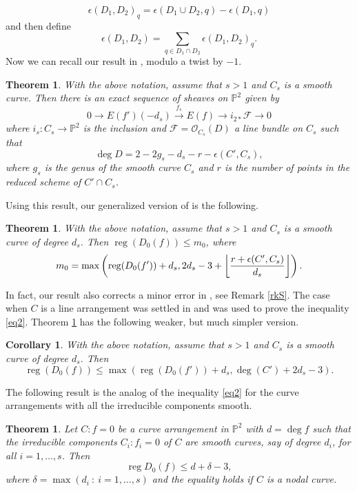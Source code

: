 \documentclass[12pt]{amsart}
\theoremstyle{plain}
\newtheorem{thm}[subsection]{Theorem}
\newtheorem{cor}[subsection]{Corollary}
\theoremstyle{definition}
\numberwithin{equation}{section}
\newcommand{\OO}{{\mathcal O}}
\newcommand{\F}{{\mathcal F}}
\newcommand{\de}{{\delta}}
\newcommand{\PP}{\mathbb{P}}
\DeclareMathOperator{\reg}{reg}
\DeclarePairedDelimiter\floor{\lfloor}{\rfloor}
\begin{document}
$$\epsilon(D_1,D_2)_q=\epsilon(D_1 \cup D_2,q)-\epsilon(D_1,q)$$
and then define
$$\epsilon(D_1,D_2)=\sum_{q \in D_1 \cap D_2}\epsilon(D_1,D_2)_q.$$
Now we can recall our result in \cite[Theorem 2.3]{POG}, modulo a twist by $-1$.
\begin{thm}
\label{thmB}
With the above notation, assume that $s>1$ and $C_s$ is a smooth curve. 
Then there is an exact  sequence of sheaves on $ \PP^2$ given by
$$ 0 \to E(f')(-d_s) \stackrel{f_s} \longrightarrow  E(f) \to i_{2*}\F \to 0$$
 where  $i_s: C_s  \to \PP^2$ is the inclusion and $\F=\OO_{C_s}(D)$ a line bundle  on ${C_s}$ such that
 $$\deg D=2-2g_s-d_s-r-\epsilon(C',C_s),$$
 where $g_s$ is the genus of the smooth curve $C_s$ and $r$ is the number of points in the reduced scheme of $C' \cap C_s$.
\end{thm}
Using this result,  our generalized version of \cite[Lemma 3.6]{STY} is the following.
\begin{thm}
\label{thm1}
With the above notation, assume that $s>1$ and $C_s$ is a smooth curve of degree $d_s$.
Then
$\reg(D_0(f)) \leq m_0$, where
$$m_0=\max \left ( \reg(D_0(f'))+d_s, 2d_s-3 + \floor*{\frac{r+\epsilon(C',C_s)}{d_s}}\right ).$$

\end{thm}
In fact, our result also corrects a minor error in  \cite[Lemma 3.6]{STY}, see Remark \ref{rkS}. The case when $C$ is a line arrangement was
settled in \cite[Theorem 3.4]{Sch0} and was used to prove the inequality \eqref{eq2}. Theorem \ref{thm1} has the following weaker, but much simpler version.
\begin{cor}
\label{corT1}
With the above notation, assume that $s>1$ and $C_s$ is a smooth curve of degree $d_s$.
Then
$$\reg(D_0(f)) \leq \max \left ( \reg(D_0(f'))+d_s, \deg(C') +2d_s-3\right ).$$

\end{cor}



The following result is the analog of the inequality \eqref{eq2} for the curve arrangements with all the irreducible components smooth. 

\begin{thm}
\label{thm2}
Let $C:f=0$ be a curve arrangement in $\PP^2$ with $d=\deg f$ such that 
 the irreducible components $C_i:f_i=0$ of $C$ are smooth curves, say of degree $d_i$, for all $i=1, \ldots,s$. Then
$$\reg D_0(f) \leq d+ \de-3,$$
where $\de=\max (d_i \ : \ i=1,\ldots ,s)$
and the equality holds if $C$ is a nodal curve.
\end{thm}
\end{document}
